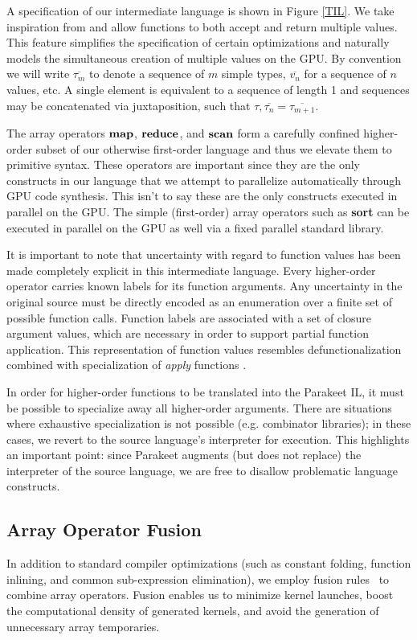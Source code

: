\documentclass[10pt,twocolumn]{article}
\begin{document}
A specification of our intermediate language is shown in Figure \ref{TIL}. We take inspiration from \cite{Bol09} and allow functions to both accept and return multiple values. This feature simplifies the specification of certain optimizations and naturally models the simultaneous creation of multiple values on the GPU. By convention we will write $\overline{\tau_m}$ to denote a sequence of $m$ simple types, $\overline{v_n}$ for a sequence  of $n$ values, etc. A single element is equivalent to a sequence of length 1 and sequences may be concatenated via juxtaposition, such that $\tau, \overline{\tau_n} = \overline{\tau_{m+1}}$.

The array operators $\mbox{\textbf{map}}$, $\mbox{\textbf{reduce}}$, and $\mbox{\textbf{scan}}$ form a carefully confined higher-order subset of our otherwise first-order language and thus we elevate them to primitive syntax. These operators are important since they are the only constructs in our language that we attempt to parallelize automatically through GPU code synthesis. This isn't to say these are the only constructs executed in parallel on the GPU. The simple (first-order) array operators such as \textbf{sort} can be executed in parallel on the GPU as well via a fixed parallel standard library. 


It is important to note that uncertainty with regard to function values has been made completely explicit in this intermediate language. Every higher-order operator carries known labels for its function arguments. Any uncertainty in the original source must be directly encoded as an enumeration over a finite set of possible function calls. Function labels are associated with a set of closure argument values, which are necessary in order to support partial function application. This representation of function values resembles defunctionalization combined with specialization of \textit{apply} functions \cite{Tolmach98}. 

In order for higher-order functions to be translated into the Parakeet IL, it must be possible to specialize away all higher-order arguments. There are situations where exhaustive specialization is not possible (e.g. combinator libraries); in these cases, we revert to the source language's interpreter for
execution. This highlights an important point: since Parakeet augments (but does not replace) the interpreter of the source language, we are free to disallow problematic language constructs.


\subsection{Array Operator Fusion}
In addition to standard compiler optimizations (such as constant folding, function inlining, and common sub-expression elimination), we employ fusion rules~\cite{Jones01} to combine array operators. Fusion enables us to minimize kernel launches, boost the computational density of generated kernels, and avoid the generation of unnecessary array temporaries.
\end{document}

